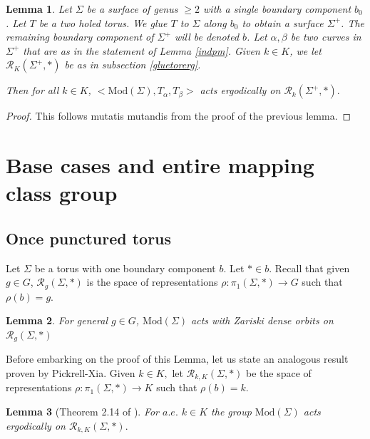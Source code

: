 \documentclass{article}
\newcommand{\Rc}{\mathcal{R}}
\newcommand{\Mod}{\textrm{Mod}}
\newtheorem{lemma}{Lemma}[theorem]
\begin{document}
\begin{lemma}\label{indpmergodic}
Let $\Sigma$ be a surface of genus $\ge 2$ with a single boundary component $b_0$. Let $T$ be a two holed torus. We glue $T$ to $\Sigma$ along $b_0$ to obtain a surface $\Sigma^+$. The remaining boundary component of $\Sigma^+$  will be denoted $b$.
Let $\alpha, \beta$ be two curves in $\Sigma^+$ that are as in the statement of Lemma \ref{indpm}.
Given $k \in K$, we let $\Rc_K(\Sigma^+, *)$ be as in subsection \ref{gluetorerg}.

Then for all $k \in K$,
 $<\Mod(\Sigma), T_{\alpha}, T_{\beta}>$ acts ergodically on $\Rc_k(\Sigma^+, *).$

\end{lemma}
\begin{proof}
    This follows mutatis mutandis from the proof of the previous lemma.
\end{proof}
\section{Base cases and entire mapping class group}


\subsection{Once punctured torus}
Let $\Sigma$ be a torus with one boundary component $b$. Let $* \in b.$
Recall that given $g \in G$, $\Rc_g(\Sigma, *)$ is the space of representations  $\rho: \pi_1(\Sigma, *)  \to G$ such that $\rho(b) =g.$
\begin{lemma}\label{Basealg}
    For general $g \in G$,    $\Mod(\Sigma)$ acts with Zariski dense orbits on $\Rc_g(\Sigma, *)$
\end{lemma}

Before embarking on the proof of this Lemma, let us state an analogous result proven by Pickrell-Xia. Given $k \in K,$ let  $\Rc_{k,K}(\Sigma, *)$ be the space of representations  $\rho: \pi_1(\Sigma, *)  \to K$ such that $\rho(b) =k.$

\begin{lemma}[Theorem 2.14 of \cite{PX}] \label{basePX}
    For $a.e.$ $ k \in K$ the group $\Mod(\Sigma)$ acts ergodically on $\Rc_{k,K}(\Sigma, *).$ 
\end{lemma}
\end{document}
